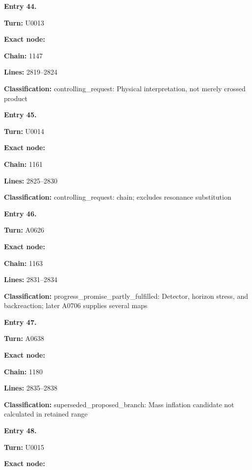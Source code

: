 \documentclass[10pt,a4paper,oneside]{report}
\begin{document}
\textbf{Entry 44.}

\textbf{Turn:} U0013

\textbf{Exact node:} \protect{}

\textbf{Chain:} 1147

\textbf{Lines:} 2819--2824

\textbf{Classification:} controlling\_request: Physical interpretation,
not merely crossed product


\textbf{Entry 45.}

\textbf{Turn:} U0014

\textbf{Exact node:} \protect{}

\textbf{Chain:} 1161

\textbf{Lines:} 2825--2830

\textbf{Classification:} controlling\_request:
\protect{} chain; excludes
resonance substitution


\textbf{Entry 46.}

\textbf{Turn:} A0626

\textbf{Exact node:} \protect{}

\textbf{Chain:} 1163

\textbf{Lines:} 2831--2834

\textbf{Classification:} progress\_promise\_partly\_fulfilled: Detector,
horizon stress, and backreaction; later A0706 supplies several maps


\textbf{Entry 47.}

\textbf{Turn:} A0638

\textbf{Exact node:} \protect{}

\textbf{Chain:} 1180

\textbf{Lines:} 2835--2838

\textbf{Classification:} superseded\_proposed\_branch: Mass inflation
candidate not calculated in retained range


\textbf{Entry 48.}

\textbf{Turn:} U0015

\textbf{Exact node:} \protect{}
\end{document}
